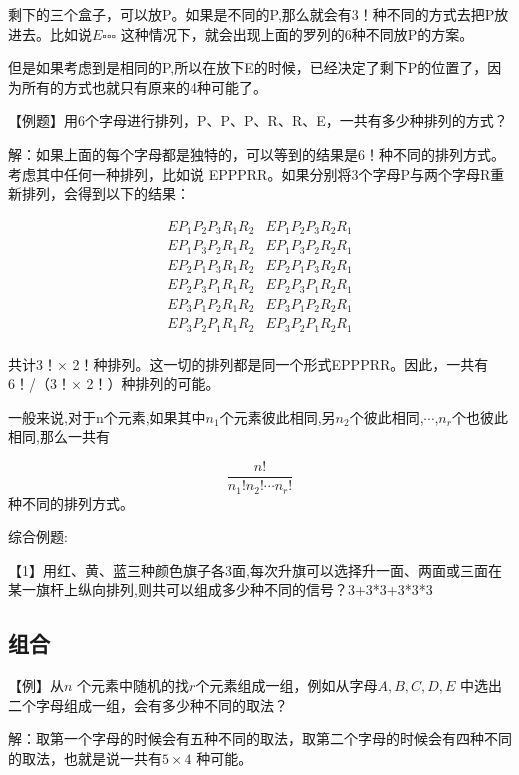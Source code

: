 剩下的三个盒子，可以放P。如果是不同的P,那么就会有3！种不同的方式去把P放进去。比如说$E\square\square\square$ 这种情况下，就会出现上面的罗列的6种不同放P的方案。

但是如果考虑到是相同的P,所以在放下E的时候，已经决定了剩下P的位置了，因为所有的方式也就只有原来的4种可能了。\par\vspace{\baselineskip}


【例题】用6个字母进行排列，P、P、P、R、R、E，一共有多少种排列的方式？

解：如果上面的每个字母都是独特的，可以等到的结果是6！种不同的排列方式。考虑其中任何一种排列，比如说 EPPPRR。如果分别将3个字母P与两个字母R重新排列，会得到以下的结果：

$$
\begin{array}{cccc}
EP_{1}P_{2}P_{3}R_{1}R_{2}  &EP_{1}P_{2}P_{3}R_{2}R_{1}  \\
EP_{1}P_{3}P_{2}R_{1}R_{2}  &EP_{1}P_{3}P_{2}R_{2}R_{1}  \\
EP_{2}P_{1}P_{3}R_{1}R_{2}  &EP_{2}P_{1}P_{3}R_{2}R_{1}  \\
EP_{2}P_{3}P_{1}R_{1}R_{2}  &EP_{2}P_{3}P_{1}R_{2}R_{1}  \\
EP_{3}P_{1}P_{2}R_{1}R_{2}  &EP_{3}P_{1}P_{2}R_{2}R_{1}  \\
EP_{3}P_{2}P_{1}R_{1}R_{2}  &EP_{3}P_{2}P_{1}R_{2}R_{1}  \\
\end{array}
$$

共计3！× 2！种排列。这一切的排列都是同一个形式EPPPRR。因此，一共有6！/（3！× 2！）种排列的可能。\par\vspace{\baselineskip}


一般来说,对于n个元素,如果其中$n_{1}$个元素彼此相同,另$n_{2}$个彼此相同,$\cdots$,$n_{r}$个也彼此相同,那么一共有

\[
	\frac{n!}{n_{1}!n_{2}! \cdots n_{r}!}
\]
种不同的排列方式。

综合例题:

【1】用红、黄、蓝三种颜色旗子各3面,每次升旗可以选择升一面、两面或三面在某一旗杆上纵向排列,则共可以组成多少种不同的信号？3+3*3+3*3*3 


\subsection{组合}
【例】从$n$ 个元素中随机的找$r$个元素组成一组，例如从字母$A,B,C,D,E$ 中选出二个字母组成一组，会有多少种不同的取法？

解：取第一个字母的时候会有五种不同的取法，取第二个字母的时候会有四种不同的取法，也就是说一共有$5 \times 4 $ 种可能。


